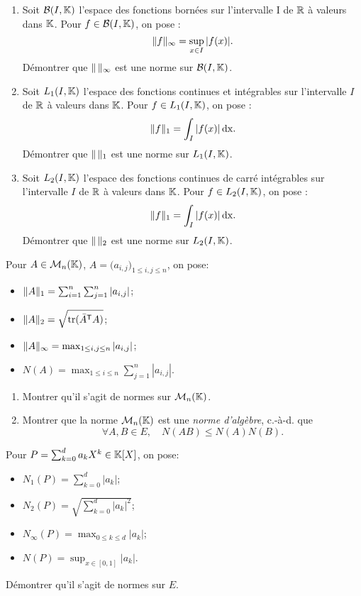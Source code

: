 \documentclass{book}
\begin{document}
\begin{Exercice}
\begin{enumerate}
\item Soit $\mathcal{B}(I, \mathbb{K})$ l'espace des fonctions bornées sur l'intervalle I de $\mathbb{R}$ à valeurs dans $\mathbb{K}$.  Pour $f \in  \mathcal{B}(I, \mathbb{K})$, on pose :
$$\mathopen\lVert f \mathclose\rVert_\infty=\sup_{x\in I}|f(x)|.$$
Démontrer que $\mathopen\lVert \, \mathclose\rVert_\infty$ est une norme sur $\mathcal{B}(I, \mathbb{K})$.
\item Soit $L_1(I, \mathbb{K})$ l'espace des fonctions continues et intégrables sur l'intervalle $I$ de $\mathbb{R}$ à valeurs dans $\mathbb{K}$. Pour $f \in L_1(I, \mathbb{K})$, on pose :
$$\mathopen\lVert f \mathclose\rVert_1=\int_I|f(x)|\,\mathrm{dx}.$$
Démontrer que  $\mathopen\lVert \, \mathclose\rVert_1$ est une norme sur $L_1(I, \mathbb{K})$.
\item Soit $L_2(I, \mathbb{K})$ l'espace des fonctions continues de carré intégrables sur l'intervalle $I$ de $\mathbb{R}$ à valeurs dans $\mathbb{K}$. Pour $f \in L_2(I, \mathbb{K})$, on pose :
$$\mathopen\lVert f \mathclose\rVert_1=\int_I|f(x)|\,\mathrm{dx}.$$
Démontrer que  $\mathopen\lVert \, \mathclose\rVert_2$ est une norme sur $L_2(I, \mathbb{K})$.
\end{enumerate}
\end{Exercice}
\begin{Exercice}
Pour $A\in \mathcal{M}_{n}(\mathbb{K})$, $A = \Big( a_{i,j} \Big)_{1\leq i,j\leq n}$, on pose:
\begin{itemize}
\item $\mathopen\lVert A \mathclose\rVert_1 = \sum_{i=1}^n \sum_{j=1}^n |a_{i,j}|$;
\item $\mathopen\lVert A \mathclose\rVert_2 = \sqrt{\operatorname{tr}(\bar A^{\mathsf {T}}A)}$;
\item $\mathopen\lVert A \mathclose\rVert_\infty= \max_{1\leq i,j\leq n} |a_{i,j}|$;
\item $ N(A) = \max_{1\leq i\leq n} \sum_{j=1}^n |a_{i,j}|$.
\end{itemize}
\begin{enumerate}
\item Montrer qu'il s'agit de normes sur $ \mathcal{M}_{n}(\mathbb{K})$.
\item Montrer que la norme $ \mathcal{M}_{n}(\mathbb{K})$ est une \emph{norme d'algèbre}, c.-à-d. que $$\forall A,B \in E,\quad N(AB) \leq N(A) N(B).$$
\end{enumerate}
\end{Exercice}
\begin{Exercice}
Pour $P=\sum_{k=0}^d a_k X^k \in \mathbb{K}[X]$, on pose:
\begin{itemize}
\item $ N_1(P) = \sum_{k=0}^d |a_k|$;
\item $ N_2(P) = \sqrt{\sum_{k=0}^d |a_k|^2}$;
\item $ N_\infty(P) = \max_{0\leq k\leq d} |a_k|$;
\item $ N(P) = \sup_{x\in[0,1]} |a_k|$.
\end{itemize}
Démontrer qu'il s'agit de normes sur $E$.
\end{Exercice}
\end{document}
